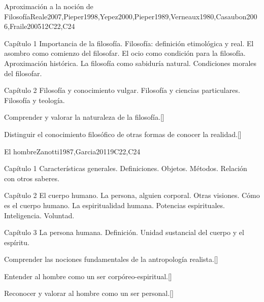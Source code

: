 \begin{syllabus}
\begin{unit}{}{Aproximación a la noción de Filosofía}{Reale2007,Pieper1998,Yepez2000,Pieper1989,Verneaux1980,Casaubon2006,Fraile2005}{12}{C22,C24}
\begin{topics}
	\item Capítulo 1 
		\subitem Importancia de la filosofía.
		\subitem Filosofía: definición etimológica y real.
		\subitem El asombro como comienzo del filosofar.
		\subitem El ocio como condición para la filosofía.
		\subitem Aproximación histórica.
		\subitem La filosofía como sabiduría natural.
		\subitem Condiciones morales del filosofar.
	\item Capítulo 2
		\subitem Filosofía y conocimiento vulgar.
		\subitem Filosofía y ciencias particulares.
		\subitem Filosofía y teología.
\end{topics}
\begin{learningoutcomes}
	\item Comprender y valorar la naturaleza de la filosofía.[\Familiarity]
	\item Distinguir el conocimiento filosófico de otras formas de conocer la realidad.[\Familiarity]
\end{learningoutcomes}
\end{unit}

\begin{unit}{}{El hombre}{Zanotti1987,Garcia2011}{9}{C22,C24}
\begin{topics}
	\item Capítulo 1
		\subitem Características generales.
		\subitem Definiciones.
		\subitem Objetos.
		\subitem Métodos.
		\subitem Relación con otros saberes.
	\item Capítulo 2
		\subitem El cuerpo humano.
		\subitem La persona, alguien corporal. 
		\subitem Otras visiones. 
		\subitem Cómo es el cuerpo humano.
		\subitem La espiritualidad humana. 
		\subitem Potencias espirituales.
			\subsubitem Inteligencia.
			\subsubitem Voluntad.
	\item Capítulo 3
		\subitem La persona humana. 
		\subitem Definición. 
		\subitem Unidad sustancial del cuerpo y el espíritu.
\end{topics}

\begin{learningoutcomes}
	\item Comprender las nociones fundamentales de la antropología realista.[\Familiarity]
	\item Entender al hombre como un ser corpóreo-espiritual.[\Familiarity]
	\item Reconocer y valorar al hombre como un ser personal.[\Familiarity]
\end{learningoutcomes}
\end{unit}


\end{syllabus}
